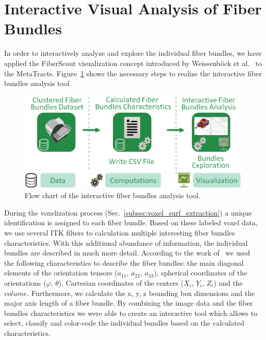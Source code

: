 \section{Interactive Visual Analysis of Fiber Bundles}
In order to interactively analyze and explore the individual fiber bundles, we have applied the FiberScout visualization concept introduced by Weissenb{\"o}ck et al.~\cite{Weissenbock2014} to the MetaTracts. Figure~\ref{fig:metatracts_fiberscout_workflow} shows the necessary steps to realize the interactive fiber bundles analysis tool.

\begin{figure}[htb]
	\centering
	\includegraphics[width=\linewidth]{images/MetaTractsToFiberScout_workflow.eps}
	\caption{Flow chart of the interactive fiber bundles analysis tool.}
	\label{fig:metatracts_fiberscout_workflow}
\end{figure}

During the voxelization process (Sec.~\ref{subsec:voxel_surf_extraction}) a unique identification is assigned to each fiber bundle. Based on these labeled voxel data, we use several ITK\cite{Ibanez2005} filters to calculation multiple interesting fiber bundles characteristics. With this additional abundance of information, the individual bundles are described in much more detail. According to the work of~\cite{Weissenbock2014} we used the following characteristics to describe the fiber bundles: the main diagonal elements of the orientation tensors ($a_{11}$, $a_{22}$, $a_{33}$), spherical coordinates of the orientations ($\varphi$, $\theta$), Cartesian coordinates of the centers ($X_{i}$, $Y_{i}$, $Z_{i}$) and the $volume$. Furthermore, we calculate the x, y, z bounding box dimensions and the major axis length of a fiber bundle. By combining the image data and the fiber bundles characteristics we were able to create an interactive tool which allows to select, classify and color-code the individual bundles based on the calculated characteristics.

